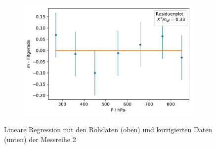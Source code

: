 \documentclass[12pt,a4paper]{article}
\begin{document}
\begin{figure}[H]
\begin{subfigure}{0.49\textwidth}
	\end{subfigure}
	\begin{subfigure}{0.49\textwidth}
		\centering
		\includegraphics[width=\textwidth]{Python/MR2_Residuen.pdf}
	\end{subfigure}
	\caption{Lineare Regression mit den Rohdaten (oben) und korrigierten Daten (unten) der Messreihe 2}
	\label{MR2_LinReg}
\end{figure}
\end{document}
